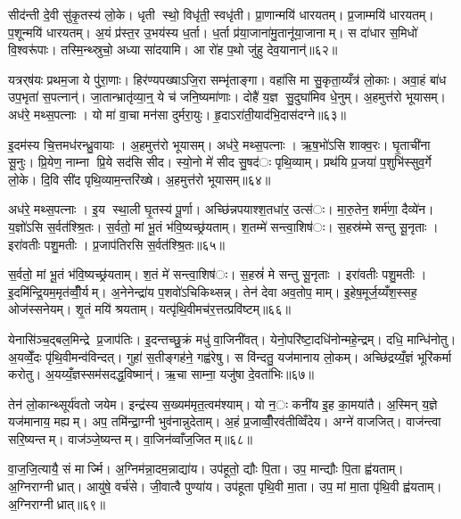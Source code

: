 सीद॑न्ती दे॒वी सु॑कृ॒तस्य॑ लो॒के। धृती स्थो॒ विधृ॑ती॒ स्वधृ॑ती। प्रा॒णान्मयि॑ धारयतम्। प्र॒जाम्मयि॑ धारयतम्। प॒शून्मयि॑ धारयतम्। अ॒यं प्र॑स्त॒र उ॒भय॑स्य ध॒र्ता। ध॒र्ता प्र॑या॒जाना॑मु॒तानू॑या॒जानाम्। स दा॑धार स॒मिधो॑ वि॒श्वरू॑पाः। तस्मि॒न्थ्स्रुचो॒ अध्या सा॑दयामि। आ रो॑ह प॒थो जु॑हु देव॒यानान्॑॥६२॥

यत्रर्‌ष॑यः प्रथम॒जा ये पु॑रा॒णाः। हिर॑ण्यपख्षाऽजि॒रा सम्भृ॑ताङ्गा। वहा॑सि मा सु॒कृता॒य्यँत्र॑ लो॒काः। अवा॒हं बा॑ध उप॒भृता॑ स॒पत्नान्॑। जा॒तान्भ्रातृ॑व्या॒न्॒ ये च॑ जनि॒ष्यमा॑णाः। दोहै॑ य॒ज्ञ सु॒दुघा॑मिव धे॒नुम्। अ॒हमुत्त॑रो भूयासम्। अध॑रे॒ मथ्स॒पत्नाः। यो मा॑ वा॒चा मन॑सा दुर्मरा॒युः। हृ॒दाऽरा॑ती॒याद॑भि॒दास॑दग्ने॥६३॥

इ॒दम॑स्य चि॒त्तमध॑रन्ध्रु॒वायाः। अ॒हमुत्त॑रो भूयासम्। अध॑रे॒ मथ्स॒पत्नाः। ऋ॒ष॒भो॑ऽसि शाक्व॒रः। घृ॒ताची॑ना सू॒नुः। प्रि॒येण॒ नाम्ना प्रि॒ये सद॑सि सीद। स्यो॒नो मे॑ सीद सु॒षद॑ः पृथि॒व्याम्। प्रथ॑यि प्र॒जया॑ प॒शुभि॑स्सुव॒र्गे लो॒के। दि॒वि सी॑द पृथि॒व्याम॒न्तरि॑ख्षे। अ॒हमुत्त॑रो भूयासम्॥६४॥

अध॑रे॒ मथ्स॒पत्नाः। इ॒य स्था॒ली घृ॒तस्य॑ पू॒र्णा। अच्छि॑न्नपयाश्श॒तधा॑र॒ उत्स॑ः। मा॒रु॒तेन॒ शर्म॑णा॒ दैव्ये॑न। य॒ज्ञो॑ऽसि स॒र्वत॑श्श्रि॒तः। स॒र्वतो॒ मां भू॒तं भ॑वि॒ष्यच्छ्र॑यताम्। श॒तम्मे॑ सन्त्वा॒शिष॑ः। स॒हस्र॑म्मे सन्तु सू॒नृताः। इरा॑वतीः पशु॒मतीः। प्र॒जाप॑तिरसि स॒र्वत॑श्श्रि॒तः॥६५॥

स॒र्वतो॒ मां भू॒तं भ॑वि॒ष्यच्छ्र॑यताम्। श॒तं मे॑ सन्त्वा॒शिष॑ः। स॒हस्रं॑ मे सन्तु सू॒नृताः। इरा॑वतीः पशु॒मतीः। इ॒दमि॑न्द्रि॒यम॒मृत॑व्वीँ॒र्यम्। अ॒नेनेन्द्रा॑य प॒शवो॑ऽचिकिथ्सन्न्। तेन॑ देवा अव॒तोप॒ माम्। इ॒हेष॒मूर्ज॒य्यँश॒स्सह॒ ओज॑स्सनेयम्। शृ॒तं मयि॑ श्रयताम्। यत्पृ॑थि॒वीमच॑र॒त्तत्प्रवि॑ष्टम्॥६६॥

येनासि॑ञ्च॒द्बल॒मिन्द्रे प्र॒जाप॑तिः। इ॒दन्तच्छु॒क्रं मधु॑ वा॒जिनी॑वत्। येनो॒परि॑ष्टा॒दधि॑नोन्महे॒न्द्रम्। दधि॒ मान्धि॑नोतु। अ॒यव्वेँ॒दः पृ॑थि॒वीमन्व॑विन्दत्। गुहा॑ स॒तीङ्गह॑ने॒ गह्व॑रेषु। स वि॑न्दतु॒ यज॑मानाय लो॒कम्। अच्छि॑द्रय्यँ॒ज्ञं भूरि॑कर्मा करोतु। अ॒यय्यँ॒ज्ञस्सम॑सदद्ध॒विष्मान्॑। ऋ॒चा साम्ना॒ यजु॑षा दे॒वता॑भिः॥६७॥

तेन॑ लो॒कान्थ्सूर्य॑वतो जयेम। इन्द्र॑स्य स॒ख्यम॑मृत॒त्वम॑श्याम्। यो न॒ः कनी॑य इ॒ह का॒मया॑तै। अ॒स्मिन् य॒ज्ञे यज॑मानाय॒ मह्यम्। अप॒ तमि॑न्द्रा॒ग्नी भुव॑नान्नुदेताम्। अ॒हं प्र॒जाव्वीँ॒रव॑तीव्विँदेय। अग्ने॑ वाजजित्। वाज॑न्त्वा सरि॒ष्यन्तम्। वाज॑ञ्जे॒ष्यन्तम्। वा॒जिन॑व्वाँज॒जितम्॥६८॥

वा॒ज॒जि॒त्यायै॒ सं मार्ज्मि। अ॒ग्निम॑न्ना॒दम॒न्नाद्या॑य। उप॑हूतो॒ द्यौः पि॒ता। उप॒ मान्द्यौः पि॒ता ह्व॑यताम्। अ॒ग्निराग्नीध्रात्। आयु॑षे॒ वर्च॑से। जी॒वात्वै पुण्या॑य। उप॑हूता पृथि॒वी मा॒ता। उप॒ मां मा॒ता पृ॑थि॒वी ह्व॑यताम्। अ॒ग्निराग्नीध्रात्॥६९॥

